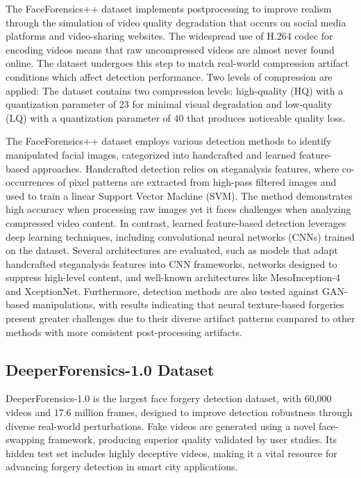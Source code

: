 \documentclass{article} %
\begin{document}
The FaceForensics++ dataset implements postprocessing to improve realism through the simulation of video quality degradation that occurs on social media platforms and video-sharing websites. The widespread use of H.264 codec for encoding videos means that raw uncompressed videos are almost never found online. The dataset undergoes this step to match real-world compression artifact conditions which affect detection performance. Two levels of compression are applied: The dataset contains two compression levels: high-quality (HQ) with a quantization parameter of 23 for minimal visual degradation and low-quality (LQ) with a quantization parameter of 40 that produces noticeable quality loss.

The FaceForensics++ dataset employs various detection methods to identify manipulated facial images, categorized into handcrafted and learned feature-based approaches. Handcrafted detection relies on steganalysis features, where co-occurrences of pixel patterns are extracted from high-pass filtered images and used to train a linear Support Vector Machine (SVM)\cite{Fridrich2012}. The method demonstrates high accuracy when processing raw images yet it faces challenges when analyzing compressed video content. In contrast, learned feature-based detection leverages deep learning techniques, including convolutional neural networks (CNNs) trained on the dataset. Several architectures are evaluated, such as models that adapt handcrafted steganalysis features into CNN frameworks, networks designed to suppress high-level content, and well-known architectures like MesoInception-4\cite{Afchar2018} and XceptionNet\cite{Chollet2017}. Furthermore, detection methods are also tested against GAN-based manipulations, with results indicating that neural texture-based forgeries present greater challenges due to their diverse artifact patterns compared to other methods with more consistent post-processing artifacts.

\subsection{DeeperForensics-1.0 Dataset}

DeeperForensics-1.0 is the largest face forgery detection dataset, with 60,000 videos and 17.6 million frames, designed to improve detection robustness through diverse real-world perturbations. Fake videos are generated using a novel face-swapping framework, producing superior quality validated by user studies. Its hidden test set includes highly deceptive videos, making it a vital resource for advancing forgery detection in smart city applications\cite{jiang2020deeperforensics}. 
\end{document}
